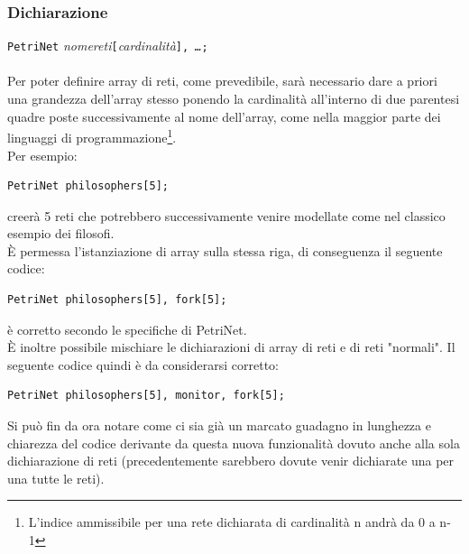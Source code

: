 \documentclass[italian,12pt]{book}
\begin{document}
\subsubsection{Dichiarazione}
{\tt PetriNet} \emph{nomereti}{\tt[}\emph{cardinalità}{\tt], \emph{\dots};}\\
\\
Per poter definire array di reti, come prevedibile, sarà necessario dare a priori una grandezza 
dell'array stesso ponendo la cardinalità all'interno di due parentesi quadre poste successivamente al nome 
dell'array, come nella maggior parte dei linguaggi di programmazione\footnote{L'indice ammissibile per una 
rete dichiarata di cardinalità n andrà da 0 a n-1}.\\
Per esempio:
\begin{verbatim}PetriNet philosophers[5];
\end{verbatim}
creerà 5 reti che potrebbero successivamente venire modellate come nel classico esempio dei filosofi.\\
È permessa l'istanziazione di array sulla stessa riga, di conseguenza il seguente codice:
\begin{verbatim}PetriNet philosophers[5], fork[5];
\end{verbatim}
è corretto secondo le specifiche di PetriNet.\\
È inoltre possibile mischiare le dichiarazioni di array di reti e di reti "normali". Il seguente codice quindi
è da considerarsi corretto:
\begin{verbatim}PetriNet philosophers[5], monitor, fork[5];
\end{verbatim}
Si può fin da ora notare come ci sia già un marcato guadagno in lunghezza e chiarezza del codice derivante 
da questa nuova funzionalità dovuto anche alla sola dichiarazione di reti (precedentemente sarebbero dovute 
venir dichiarate una per una tutte le reti).
\end{document}
